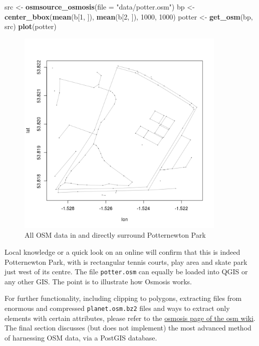 \documentclass[]{article}
\newenvironment{Shaded}{}{}
\newcommand{\KeywordTok}[1]{\textcolor[rgb]{0.00,0.44,0.13}{\textbf{{#1}}}}
\newcommand{\DataTypeTok}[1]{\textcolor[rgb]{0.56,0.13,0.00}{{#1}}}
\newcommand{\DecValTok}[1]{\textcolor[rgb]{0.25,0.63,0.44}{{#1}}}
\newcommand{\StringTok}[1]{\textcolor[rgb]{0.25,0.44,0.63}{{#1}}}
\newcommand{\NormalTok}[1]{{#1}}
\let\Oldincludegraphics\includegraphics
\renewcommand{\includegraphics}[1]{\Oldincludegraphics[width=10cm]{#1}}
\begin{document}
\begin{Shaded}
\begin{Highlighting}[]
\NormalTok{src <- }\KeywordTok{osmsource_osmosis}\NormalTok{(}\DataTypeTok{file =} \StringTok{"data/potter.osm"}\NormalTok{)}
\NormalTok{bp <- }\KeywordTok{center_bbox}\NormalTok{(}\KeywordTok{mean}\NormalTok{(b[}\DecValTok{1}\NormalTok{, ]), }\KeywordTok{mean}\NormalTok{(b[}\DecValTok{2}\NormalTok{, ]), }\DecValTok{1000}\NormalTok{, }\DecValTok{1000}\NormalTok{)}
\NormalTok{potter <- }\KeywordTok{get_osm}\NormalTok{(bp, src)}
\KeywordTok{plot}\NormalTok{(potter)}
\end{Highlighting}
\end{Shaded}
\begin{figure}[htbp]
\centering
\includegraphics{figure/All_OSM_data_in_and_directly_surround_Potternewton_Park.png}
\caption{All OSM data in and directly surround
Potternewton Park}
\end{figure}

Local knowledge or a quick look on an online will confirm that this is
indeed Potternewton Park, with is rectangular tennis courts, play area
and skate park just west of its centre. The file \texttt{potter.osm} can
equally be loaded into QGIS or any other GIS. The point is to illustrate
how Osmosis works.

For further functionality, including clipping to polygons, extracting
files from enormous and compressed \texttt{planet.osm.bz2} files and
ways to extract only elements with certain attributes, please refer to
the \href{http://wiki.openstreetmap.org/wiki/Osmosis}{osmosis page of
the osm wiki}. The final section discusses (but does not implement) the
most advanced method of harnessing OSM data, via a PostGIS database.
\end{document}
